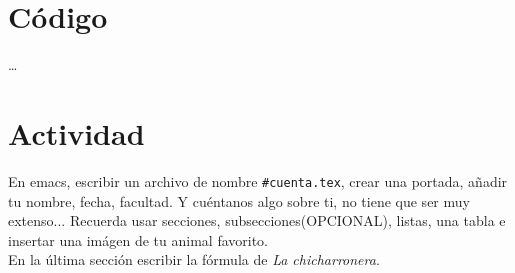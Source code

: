 \documentclass[11pt]{article} %
\begin{document}
\section{Código}
\dots

\section{Actividad}
En emacs, escribir un archivo de nombre \texttt{#cuenta.tex}, crear una portada,
añadir tu nombre, fecha, facultad. Y cuéntanos algo sobre ti, no tiene que ser
muy extenso... Recuerda usar secciones, subsecciones(OPCIONAL), listas, una
tabla e insertar una imágen de tu animal favorito.\\
En la última sección escribir la fórmula de \textit{La chicharronera}.
\end{document}
